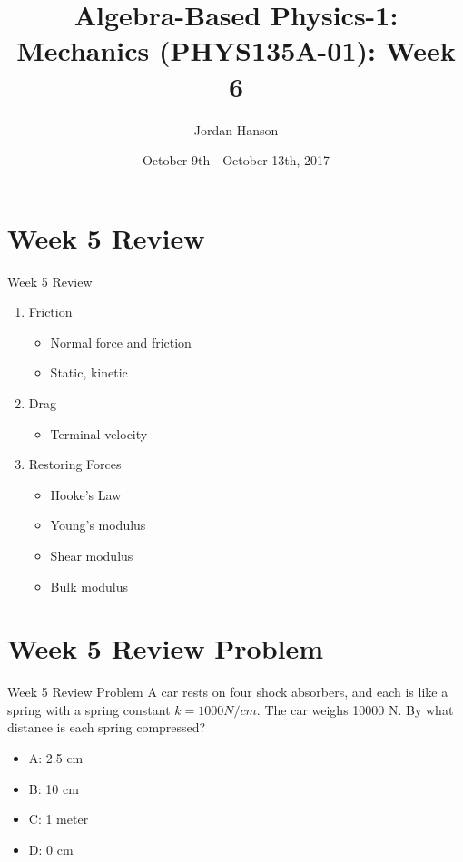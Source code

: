 \documentclass{beamer}
\title{Algebra-Based Physics-1: Mechanics (PHYS135A-01): Week 6}
\date{October 9th - October 13th, 2017}
\author{Jordan Hanson}
\institute{Whittier College Department of Physics and Astronomy}
\begin{document}
\maketitle

\section{Week 5 Review}

\begin{frame}{Week 5 Review}
\begin{enumerate}
\item \alert{Friction}
\begin{itemize}
\item Normal force and friction
\item Static, kinetic
\end{itemize}
\item \alert{Drag}
\begin{itemize}
\item Terminal velocity
\end{itemize}
\item \alert{Restoring Forces}
\begin{itemize}
\item Hooke's Law
\item Young's modulus
\item Shear modulus
\item Bulk modulus
\end{itemize}
\end{enumerate}
\end{frame}

\section{Week 5 Review Problem}

\begin{frame}{Week 5 Review Problem}
A car rests on four shock absorbers, and each is like a spring with a spring constant $k = 1000 N/cm$.  The car weighs 10000 N.  By what distance is each spring compressed?
\begin{itemize}
\item A: 2.5 cm
\item B: 10 cm
\item C: 1 meter
\item D: 0 cm
\end{itemize}
\end{frame}
\end{document}
